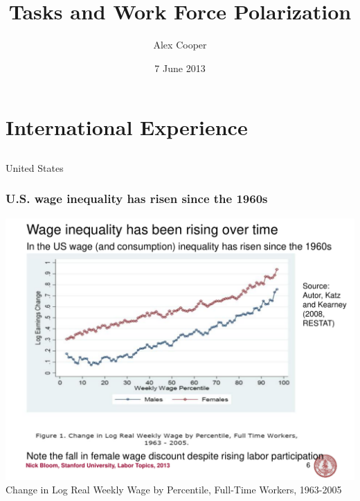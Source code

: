\documentclass[red]{beamer}
\title[Polarization and Tasks]{Tasks and Work Force Polarization}
\author{Alex Cooper}
\date{7 June 2013}
\begin{document}
%
\begin{frame}
\titlepage
\end{frame}
%
\section{International Experience}
\subsection{}

\begin{frame}[t]{United States}
\frametitle{U.S. wage inequality has risen since the 1960s}
\begin{center}
  \includegraphics[width=\textwidth]{slides/katz_kearney_2008_log_e_chg.pdf}
  \\
  Change in Log Real Weekly Wage by Percentile, Full-Time Workers, 1963-2005
  \citep{Autor2008}
\end{center}
\end{frame}
\end{document}
